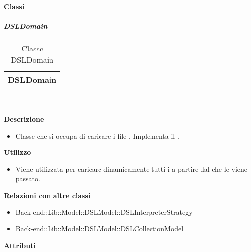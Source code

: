 		\paragraph{Classi}
			\subparagraph{DSLDomain} 
\begin{table}[ht]
\begin{center}
\bgroup
	\setlength{\arrayrulewidth}{0.6mm}
	\def\arraystretch{1}
		\begin{tabular}{ | p{12cm} | }
				\hline  
					\centerline{\textbf{DSLDomain}}
		\\ \hline 
				\hline
				\hline
		
		\end{tabular}
\egroup
\caption{Classe DSLDomain}
\end{center}
\end{table}  \textbf{\\ \\ Descrizione} 
					\begin{itemize}
						\item[] Classe che si occupa di caricare i file . Implementa il  .
					\end{itemize}      
				\textbf{Utilizzo}  
					\begin{itemize}
						\item[] Viene utilizzata per caricare dinamicamente tutti i  a partire dal  che le viene passato.
					\end{itemize}
					\textbf{Relazioni con altre classi}
					\begin{itemize}
							\item{Back-end::Lib::Model::DSLModel::DSLInterpreterStrategy}
							\item{Back-end::Lib::Model::DSLModel::DSLCollectionModel}
					\end{itemize}
			 \textbf{Attributi} 
	\begin{itemize}
		\end{itemize}
		

